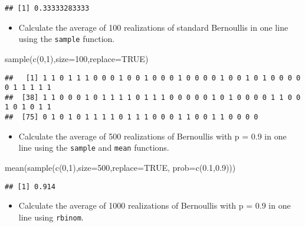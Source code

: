 \documentclass[
]{article}
\newenvironment{Shaded}{\begin{snugshade}}{\end{snugshade}}
\newcommand{\AttributeTok}[1]{\textcolor[rgb]{0.77,0.63,0.00}{#1}}
\newcommand{\ConstantTok}[1]{\textcolor[rgb]{0.00,0.00,0.00}{#1}}
\newcommand{\DecValTok}[1]{\textcolor[rgb]{0.00,0.00,0.81}{#1}}
\newcommand{\FloatTok}[1]{\textcolor[rgb]{0.00,0.00,0.81}{#1}}
\newcommand{\FunctionTok}[1]{\textcolor[rgb]{0.00,0.00,0.00}{#1}}
\newcommand{\NormalTok}[1]{#1}
\providecommand{\tightlist}{%
  \setlength{\itemsep}{0pt}\setlength{\parskip}{0pt}}
\begin{document}
\begin{verbatim}
## [1] 0.33333283333
\end{verbatim}

\begin{itemize}
\tightlist
\item
  Calculate the average of 100 realizations of standard Bernoullis in
  one line using the \texttt{sample} function.
\end{itemize}

\begin{Shaded}
\begin{Highlighting}[]
\FunctionTok{sample}\NormalTok{(}\FunctionTok{c}\NormalTok{(}\DecValTok{0}\NormalTok{,}\DecValTok{1}\NormalTok{),}\AttributeTok{size=}\DecValTok{100}\NormalTok{,}\AttributeTok{replace=}\ConstantTok{TRUE}\NormalTok{)}
\end{Highlighting}
\end{Shaded}

\begin{verbatim}
##   [1] 1 1 0 1 1 1 0 0 0 1 0 0 1 0 0 0 1 0 0 0 0 1 0 0 1 0 1 0 0 0 0 0 1 1 1 1 1
##  [38] 1 1 0 0 0 1 0 1 1 1 1 0 1 1 1 0 0 0 0 0 1 0 1 0 0 0 0 1 1 0 0 1 0 1 0 1 1
##  [75] 0 1 0 1 0 1 1 1 1 0 1 1 1 0 0 0 1 1 0 0 1 1 0 0 0 0
\end{verbatim}

\begin{itemize}
\tightlist
\item
  Calculate the average of 500 realizations of Bernoullis with p = 0.9
  in one line using the \texttt{sample} and \texttt{mean} functions.
\end{itemize}

\begin{Shaded}
\begin{Highlighting}[]
\FunctionTok{mean}\NormalTok{(}\FunctionTok{sample}\NormalTok{(}\FunctionTok{c}\NormalTok{(}\DecValTok{0}\NormalTok{,}\DecValTok{1}\NormalTok{),}\AttributeTok{size=}\DecValTok{500}\NormalTok{,}\AttributeTok{replace=}\ConstantTok{TRUE}\NormalTok{, }\AttributeTok{prob=}\FunctionTok{c}\NormalTok{(}\FloatTok{0.1}\NormalTok{,}\FloatTok{0.9}\NormalTok{)))}
\end{Highlighting}
\end{Shaded}

\begin{verbatim}
## [1] 0.914
\end{verbatim}

\begin{itemize}
\tightlist
\item
  Calculate the average of 1000 realizations of Bernoullis with p = 0.9
  in one line using \texttt{rbinom}.
\end{itemize}
\end{document}
